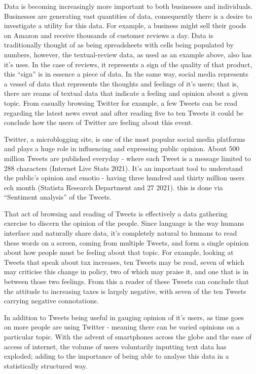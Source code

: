 \documentclass[
]{article}
\begin{document}
Data is becoming increasingly more important to both businesses and
individuals. Businesses are generating vast quantities of data,
consequently there is a desire to investigate a utility for this data.
For example, a business might sell their goods on Amazon and receive
thousands of customer reviews a day. Data is traditionally thought of as
being spreadsheets with cells being populated by numbers, however, the
textual-review data, as used as an example above, also has it's uses. In
the case of reviews, it represents a sign of the quality of that
product, this ``sign'' is in essence a piece of data. In the same way,
social media represents a vessel of data that represents the thoughts
and feelings of it's users; that is, there are reams of textual data
that indicate a feeling and opinion about a given topic. From casually
browsing Twitter for example, a few Tweets can be read regarding the
latest news event and after reading five to ten Tweets it could be
conclude how the users of Twitter are feeling about this event.

Twitter, a microblogging site, is one of the most popular social media
platforms and plays a huge role in influencing and expressing public
opinion. About 500 million Tweets are published everyday - where each
Tweet is a message limited to 288 characters (Internet Live Stats 2021).
It's an important tool to understand the public's opinion and emotio -
having three hundred and thirty million users ech month (Statista
Research Department and 27 2021). this is done via ``Sentiment
analysis'' of the Tweets.

That act of browsing and reading of Tweets is effectively a data
gathering exercise to discern the opinion of the people. Since language
is the way humans interface and naturally share data, it's completely
natural to humans to read these words on a screen, coming from multiple
Tweets, and form a single opinion about how people must be feeling about
that topic. For example, looking at Tweets that speak about tax
increases, ten Tweets may be read, seven of which may criticise this
change in policy, two of which may praise it, and one that is in between
those two feelings. From this a reader of these Tweets can conclude that
the attitude to increasing taxes is largely negative, with seven of the
ten Tweets carrying negative connotations.

In addition to Tweets being useful in gauging opinion of it's users, as
time goes on more people are using Twitter - meaning there can be varied
opinions on a particular topic. With the advent of smartphones across
the globe and the ease of access of internet, the volume of users
voluntarily inputting text data has exploded; adding to the importance
of being able to analyse this data in a statistically structured way.
\end{document}
